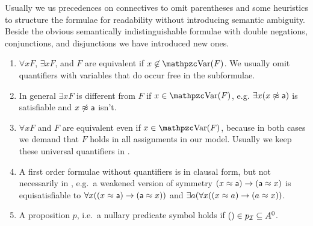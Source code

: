 \begin{remark}Usually we us precedences on connectives to omit parentheses 
	and some heuristics to structure the formulae for readability 
	without introducing semantic ambiguity.
%
	Beside the obvious semantically indistinguishable formulae with double negations, conjunctions, and disjunctions 
	we have introduced new ones.
	\begin{enumerate}
		\item $\forall x F$, $\exists x F$, and $F$ are equivalent if $x\not\in\var(F)$. 
		We usually omit quantifiers with variables that do occur free in the subformulae.
		\item In general $\exists x F$ is different from $F$ if $x\in\var(F)$, e.g. $\exists x(x\not\approx{\mathsf a})$ is satisfiable and $x\not\approx{\mathsf a}$ isn't.
		\item $\forall x F$ and $F$ are equivalent even if $x\in\var(F)$, 
		because in both cases we demand that $F$ holds in all assignments in our model.
		Usually we keep these universal quantifiers in \FOF.
		
		\item A first order formulae without quantifiers is in {\myem clausal form}, 
		but not necessarily in \CNF, e.g.~a weakened version of symmetry $(x\approx {\mathsf a})\rightarrow ({\mathsf a}\approx x)$ 
		is equisatisfiable to $\forall x ((x\approx {\mathsf a})\rightarrow ({\mathsf a}\approx x))$ 
		and $\exists a (\forall x ((x\approx a)\rightarrow (a\approx x))$. 
		\item A proposition $p$, i.e.~a nullary predicate symbol holds if $()\in p_{\mathcal I} \subseteq A^0$.
	\end{enumerate}

\end{remark}